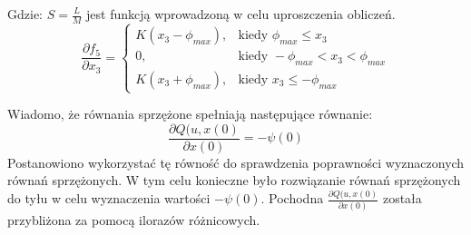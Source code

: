 \noindent Gdzie:\newline
\(S=\frac{L}{M}\) jest funkcją wprowadzoną w celu uproszczenia obliczeń.
\begin{equation}
\frac{\partial f_5}{\partial x_3}=
	\begin{cases}
	K(x_3-\phi_{max}), & \text{kiedy } \phi_{max}\leqslant x_3\\
	0, & \text{kiedy } -\phi_{max}<x_3<\phi_{max}\\
	K(x_3+\phi_{max}), & \text{kiedy } x_3\leqslant -\phi_{max}
	\end{cases}
\end{equation}

Wiadomo, że równania sprzężone spełniają następujące równanie:
\begin{equation}
\frac{\partial Q(u,x(0)}{\partial x(0)}=-\psi(0)
\end{equation}
Postanowiono wykorzystać tę równość do sprawdzenia poprawności wyznaczonych równań sprzężonych. W tym celu konieczne było rozwiązanie równań sprzężonych do tyłu w celu wyznaczenia wartości \(-\psi(0)\). Pochodna \(\frac{\partial Q(u,x(0)}{\partial x(0)}\) została przybliżona za pomocą ilorazów różnicowych.